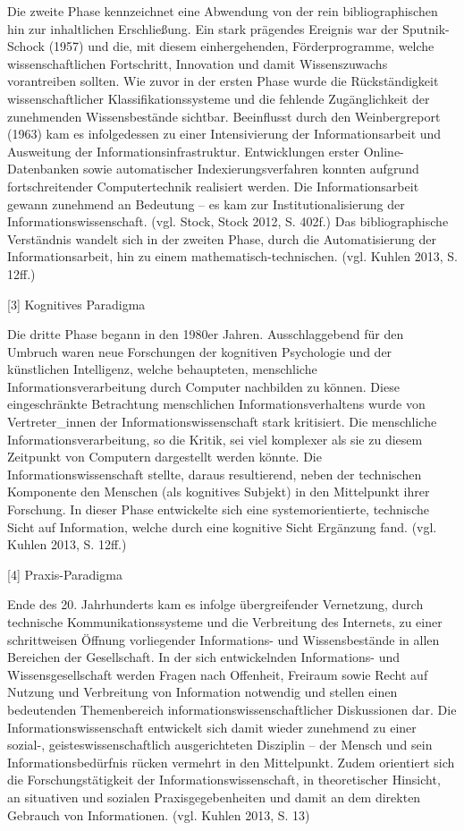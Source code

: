 \documentclass[a4paper,
fontsize=11pt,
oneside,
numbers=noperiodatend,
parskip=half-,
bibliography=totoc,
final
]{scrartcl}
\begin{document}
Die zweite Phase kennzeichnet eine Abwendung von der rein
bibliographischen hin zur inhaltlichen Erschließung. Ein stark prägendes
Ereignis war der Sputnik-Schock (1957) und die, mit diesem
einhergehenden, Förderprogramme, welche wissenschaftlichen Fortschritt,
Innovation und damit Wissenszuwachs vorantreiben sollten. Wie zuvor in
der ersten Phase wurde die Rückständigkeit wissenschaftlicher
Klassifikationssysteme und die fehlende Zugänglichkeit der zunehmenden
Wissensbestände sichtbar. Beeinflusst durch den Weinbergreport (1963)
kam es infolgedessen zu einer Intensivierung der Informationsarbeit und
Ausweitung der Informationsinfrastruktur. Entwicklungen erster
Online-Datenbanken sowie automatischer Indexierungsverfahren konnten
aufgrund fortschreitender Computertechnik realisiert werden. Die
Informationsarbeit gewann zunehmend an Bedeutung -- es kam zur
Institutionalisierung der Informationswissenschaft. (vgl. Stock, Stock
2012, S. 402f.) Das bibliographische Verständnis wandelt sich in der
zweiten Phase, durch die Automatisierung der Informationsarbeit, hin zu
einem mathematisch-technischen. (vgl. Kuhlen 2013, S. 12ff.)

{[}3{]} Kognitives Paradigma

Die dritte Phase begann in den 1980er Jahren. Ausschlaggebend für den
Umbruch waren neue Forschungen der kognitiven Psychologie und der
künstlichen Intelligenz, welche behaupteten, menschliche
Informationsverarbeitung durch Computer nachbilden zu können. Diese
eingeschränkte Betrachtung menschlichen Informationsverhaltens wurde von
Vertreter\_innen der Informationswissenschaft stark kritisiert. Die
menschliche Informationsverarbeitung, so die Kritik, sei viel komplexer
als sie zu diesem Zeitpunkt von Computern dargestellt werden könnte. Die
Informationswissenschaft stellte, daraus resultierend, neben der
technischen Komponente den Menschen (als kognitives Subjekt) in den
Mittelpunkt ihrer Forschung. In dieser Phase entwickelte sich eine
systemorientierte, technische Sicht auf Information, welche durch eine
kognitive Sicht Ergänzung fand. (vgl. Kuhlen 2013, S. 12ff.)

{[}4{]} Praxis-Paradigma

Ende des 20. Jahrhunderts kam es infolge übergreifender Vernetzung,
durch technische Kommunikationssysteme und die Verbreitung des
Internets, zu einer schrittweisen Öffnung vorliegender Informations- und
Wissensbestände in allen Bereichen der Gesellschaft. In der sich
entwickelnden Informations- und Wissensgesellschaft werden Fragen nach
Offenheit, Freiraum sowie Recht auf Nutzung und Verbreitung von
Information notwendig und stellen einen bedeutenden Themenbereich
informationswissenschaftlicher Diskussionen dar. Die
Informationswissenschaft entwickelt sich damit wieder zunehmend zu einer
sozial-, geisteswissenschaftlich ausgerichteten Disziplin -- der Mensch
und sein Informationsbedürfnis rücken vermehrt in den Mittelpunkt. Zudem
orientiert sich die Forschungstätigkeit der Informationswissenschaft, in
theoretischer Hinsicht, an situativen und sozialen Praxisgegebenheiten
und damit an dem direkten Gebrauch von Informationen. (vgl. Kuhlen 2013,
S. 13)
\end{document}
